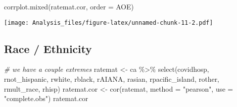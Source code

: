\documentclass[
]{article}
\newenvironment{Shaded}{\begin{snugshade}}{\end{snugshade}}
\newcommand{\AttributeTok}[1]{\textcolor[rgb]{0.77,0.63,0.00}{#1}}
\newcommand{\CommentTok}[1]{\textcolor[rgb]{0.56,0.35,0.01}{\textit{#1}}}
\newcommand{\FunctionTok}[1]{\textcolor[rgb]{0.00,0.00,0.00}{#1}}
\newcommand{\NormalTok}[1]{#1}
\newcommand{\OtherTok}[1]{\textcolor[rgb]{0.56,0.35,0.01}{#1}}
\newcommand{\SpecialCharTok}[1]{\textcolor[rgb]{0.00,0.00,0.00}{#1}}
\newcommand{\StringTok}[1]{\textcolor[rgb]{0.31,0.60,0.02}{#1}}
\begin{document}
\begin{Shaded}
\begin{Highlighting}[]
\FunctionTok{corrplot.mixed}\NormalTok{(ratemat.cor, }\AttributeTok{order =} \StringTok{\textquotesingle{}AOE\textquotesingle{}}\NormalTok{)}
\end{Highlighting}
\end{Shaded}

\texttt{[image: Analysis\_files/figure-latex/unnamed-chunk-11-2.pdf]}

\hypertarget{race-ethnicity}{%
\subsection{Race / Ethnicity}\label{race-ethnicity}}

\begin{Shaded}
\begin{Highlighting}[]
\CommentTok{\# we have a couple extremes}
\NormalTok{ratemat }\OtherTok{\textless{}{-}}\NormalTok{ ca }\SpecialCharTok{\%\textgreater{}\%} \FunctionTok{select}\NormalTok{(covidhosp, rnot\_hispanic, rwhite, rblack, rAIANA, rasian, rpacific\_island, rother, rmult\_race, rhisp)}
\NormalTok{ratemat.cor }\OtherTok{\textless{}{-}} \FunctionTok{cor}\NormalTok{(ratemat,  }\AttributeTok{method =} \StringTok{"pearson"}\NormalTok{, }\AttributeTok{use =} \StringTok{"complete.obs"}\NormalTok{)}
\NormalTok{ratemat.cor}
\end{Highlighting}
\end{Shaded}
\end{document}
